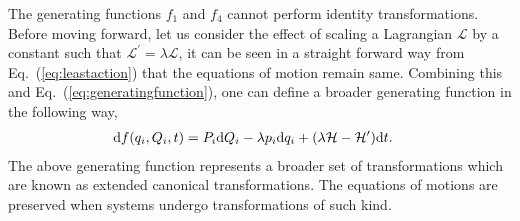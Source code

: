 \documentclass[a4paper]{article}
\begin{document}
The generating functions $f_{1}$ and $f_{4}$ cannot perform identity transformations. Before moving forward, let us consider the effect of scaling a Lagrangian $\mathcal{L}$ by a constant such that $\mathcal{L}^{\prime}=\lambda\mathcal{L}$, it can be seen in a straight forward way from Eq.~(\ref{eq:leastaction}) that the equations of motion remain same. Combining this and Eq.~(\ref{eq:generatingfunction}), one can define a broader generating function in the following way,
\begin{equation}\label{eq:generatingfunction}
\begin{split}
{\rm d}f(q_{i},Q_{i},t)&=P_{i}{\rm d}Q_{i}-\lambda p_{i}{\rm d}q_{i}+(\lambda\mathcal{H}-\mathcal{H}^{\prime}){\rm d}t.
\end{split}
\end{equation}
The above generating function represents a broader set of transformations which are known as extended canonical transformations. The equations of motions are preserved when systems undergo transformations of such kind.
\end{document}
